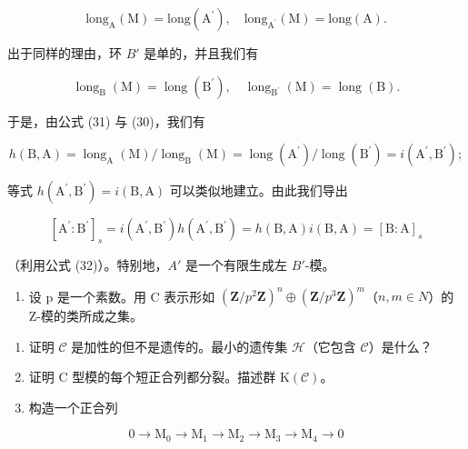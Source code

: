 \[
\mathrm{long} _ {\mathrm{A}} (\mathrm{M}) = \mathrm{long} (\mathrm{A} ^ {\prime}), \quad \mathrm{long} _ {\mathrm{A} ^ {\prime}} (\mathrm{M}) = \mathrm{long} (\mathrm{A}).
\]

出于同样的理由，环 \(B'\) 是单的，并且我们有

\[
\operatorname{long} _ {\mathrm{B}} (\mathrm{M}) = \operatorname{long} \left(\mathrm{B} ^ {\prime}\right), \quad \operatorname{long} _ {\mathrm{B} ^ {\prime}} (\mathrm{M}) = \operatorname{long} (\mathrm{B}).
\]

于是，由公式 (31) 与 (30)，我们有

\[
h (\mathrm{B}, \mathrm{A}) = \operatorname{long} _ {\mathrm{A}} (\mathrm{M}) / \operatorname{long} _ {\mathrm{B}} (\mathrm{M}) = \operatorname{long} \left(\mathrm{A} ^ {\prime}\right) / \operatorname{long} \left(\mathrm{B} ^ {\prime}\right) = i \left(\mathrm{A} ^ {\prime}, \mathrm{B} ^ {\prime}\right);
\]

等式 \(h(\mathrm{A}^{\prime},\mathrm{B}^{\prime}) = i(\mathrm{B},\mathrm{A})\) 可以类似地建立。由此我们导出

\[
[ \mathrm{A} ^ {\prime}: \mathrm{B} ^ {\prime} ] _ {s} = i (\mathrm{A} ^ {\prime}, \mathrm{B} ^ {\prime}) h (\mathrm{A} ^ {\prime}, \mathrm{B} ^ {\prime}) = h (\mathrm{B}, \mathrm{A}) i (\mathrm{B}, \mathrm{A}) = [ \mathrm{B}: \mathrm{A} ] _ {s}
\]

（利用公式 (32)）。特别地，\(A'\) 是一个有限生成左 \(B'\)-模。


\begin{enumerate}
\def\labelenumi{\arabic{enumi})}
\tightlist
\item
  设 p 是一个素数。用 C 表示形如 \((\mathbf{Z}/p^{2}\mathbf{Z})^{n} \oplus (\mathbf{Z}/p^{3}\mathbf{Z})^{m}\)（\(n, m \in N\)）的 Z-模的类所成之集。
\end{enumerate}

\begin{enumerate}
\def\labelenumi{\alph{enumi})}
\item
  证明 \(\mathcal{C}\) 是加性的但不是遗传的。最小的遗传集 \(\mathcal{H}\)（它包含 \(\mathcal{C}\)）是什么？
\item
  证明 C 型模的每个短正合列都分裂。描述群 \(\mathrm{K}(\mathcal{C})\)。
\item
  构造一个正合列
\end{enumerate}

\[
0 \to \mathrm{M} _ {0} \to \mathrm{M} _ {1} \to \mathrm{M} _ {2} \to \mathrm{M} _ {3} \to \mathrm{M} _ {4} \to 0
\]

